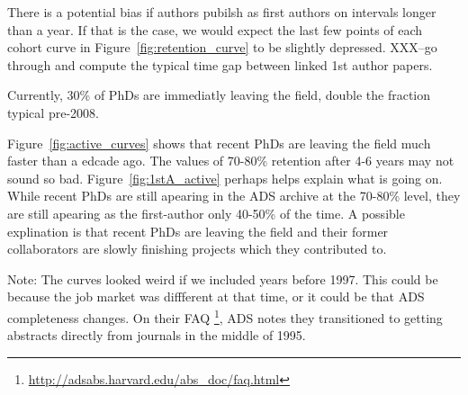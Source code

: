 \documentclass{emulateapj}
\begin{document}
There is a potential bias if authors pubilsh as first authors on intervals longer than a year.  If that is the case, we would expect the last few points of each cohort curve in Figure~\ref{fig:retention_curve} to be slightly depressed.  XXX--go through and compute the typical time gap between linked 1st author papers.  

Currently, 30\% of PhDs are immediatly leaving the field, double the fraction typical pre-2008.  





Figure~\ref{fig:active_curves} shows that recent PhDs are leaving the field much faster than a edcade ago.  The values of 70-80\% retention after 4-6 years may not sound so bad.  Figure~\ref{fig:1stA_active} perhaps helps explain what is going on. While recent PhDs are still apearing in the ADS archive at the 70-80\% level, they are still apearing as the first-author only 40-50\% of the time. A possible explination is that recent PhDs are leaving the field and their former collaborators are slowly finishing projects which they contributed to.


Note:  The curves looked weird if we included years before 1997. This could be because the job market was diffferent at that time, or it could be that ADS completeness changes. On their FAQ \footnote{\url{http://adsabs.harvard.edu/abs\_doc/faq.html}}, ADS notes they transitioned to getting abstracts directly from journals in the middle of 1995.
\end{document}
